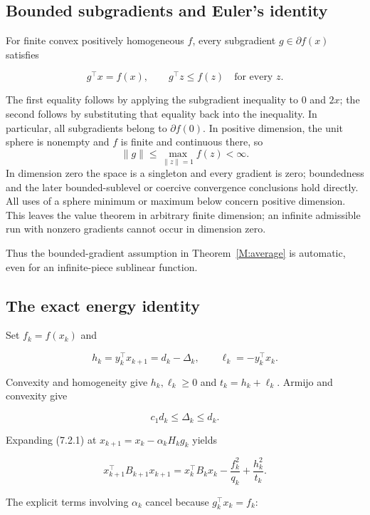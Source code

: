 

\subsection{Bounded subgradients and Euler's
identity}\label{H:bounded-subgradients-and-eulers-identity}

For finite convex positively homogeneous \(f\), every subgradient
\(g\in\partial f(x)\) satisfies

\[
g^\top x=f(x),\qquad g^\top z\le f(z)\quad\text{for every }z.
\]

The first equality follows by applying the subgradient inequality to
\(0\) and \(2x\); the second follows by substituting that equality back
into the inequality. In particular, all subgradients belong to
\(\partial f(0)\). In positive dimension, the unit sphere is nonempty and \(f\) is finite and continuous there, so
\[
\|g\|\le\max_{\|z\|=1}f(z)<\infty.
\]
In dimension zero the space is a singleton and every gradient is zero; boundedness and the later bounded-sublevel or coercive convergence conclusions hold directly. All uses of a sphere minimum or maximum below concern positive dimension. This leaves the value theorem in arbitrary finite dimension; an infinite admissible run with nonzero gradients cannot occur in dimension zero.

Thus the bounded-gradient assumption in Theorem~\ref{M:average} is automatic, even for
an infinite-piece sublinear function.



\subsection{The exact energy
identity}\label{H:the-exact-energy-identity}

Set \(f_k=f(x_k)\) and

\[
h_k=y_k^\top x_{k+1}=d_k-\Delta_k,\qquad
\ell_k=-y_k^\top x_k.
\]

Convexity and homogeneity give \(h_k,\ell_k\ge0\) and
\(t_k=h_k+\ell_k\). Armijo and convexity give

\[
c_1d_k\le\Delta_k\le d_k.
\]

Expanding (7.2.1) at \(x_{k+1}=x_k-\alpha_kH_kg_k\) yields

\[
\boxed{
x_{k+1}^\top B_{k+1}x_{k+1}
=x_k^\top B_kx_k-\frac{f_k^2}{q_k}+\frac{h_k^2}{t_k}.
}
\tag{7.5.1}
\]

The explicit terms involving \(\alpha_k\) cancel because
\(g_k^\top x_k=f_k\):

